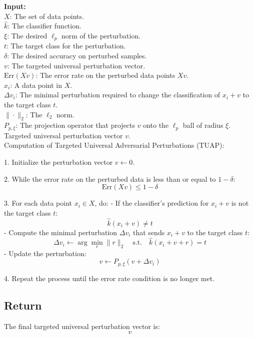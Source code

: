 \textbf{Input:} \\
$ X $: The set of data points. \\
$ \hat{k} $: The classifier function. \\
$ \xi $: The desired $\ell_p$ norm of the perturbation. \\
$ t $: The target class for the perturbation. \\
$ \delta $: The desired accuracy on perturbed samples. \\
$ v $: The targeted universal perturbation vector. \\
$ \text{Err}(Xv) $: The error rate on the perturbed data points $ Xv $. \\
$ x_i $: A data point in $ X $. \\
$ \Delta v_i $: The minimal perturbation required to change the classification of $ x_i + v $ to the target class $ t $. \\
$ \| \cdot \|_2 $: The $\ell_2$ norm. \\
$ P_{p, \xi} $: The projection operator that projects $ v $ onto the $\ell_p$ ball of radius $ \xi $. \\

Targeted universal perturbation vector $ v $. \\

Computation of Targeted Universal Adversarial Perturbations (TUAP):

1. Initialize the perturbation vector $v \leftarrow 0$.

2. While the error rate on the perturbed data is less than or equal to $1 - \delta$:
\[
\text{Err}(Xv) \leq 1 - \delta
\]

3. For each data point $x_i \in X$, do:
    - If the classifier's prediction for $x_i + v$ is not the target class $t$:
    \[
    \hat{k}(x_i + v) \neq t
    \]
        - Compute the minimal perturbation $\Delta v_i$ that sends $x_i + v$ to the target class $t$:
        \[
        \Delta v_i \leftarrow \arg \min_{r} \|r\|_2 \quad \text{s.t.} \quad \hat{k}(x_i + v + r) = t
        \]
        - Update the perturbation:
        \[
        v \leftarrow P_{p, \xi}(v + \Delta v_i)
        \]

4. Repeat the process until the error rate condition is no longer met.

\subsection*{Return}
The final targeted universal perturbation vector is:
\[
v
\]


